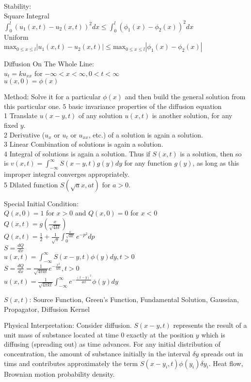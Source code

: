 Stability: \\
Square Integral \\
$\int_0^l (u_1 (x,t) - u_2 (x,t))^2 dx \le \int_0^l (\phi_1 (x) - \phi_2 (x))^2 dx$ \\
Uniform \\
$\text{max}_{0 \le x \le l} |u_1 (x,t) - u_2 (x,t)| \le \text{max}_{0 \le x \le l} |\phi_1 (x) - \phi_2 (x)|$

Diffusion On The Whole Line: \\
$u_t = k u_{xx}$ for $ -\infty < x < \infty, 0 < t < \infty$ \\
$u(x,0)=\phi (x)$

Method: Solve it for a particular $\phi (x)$ and then build the general solution from this particular one. $5$ basic invariance properties of the diffusion equation \\
1 Translate $u(x-y,t)$ of any solution $u(x,t)$ is another solution, for any fixed $y$. \\
2 Derivative ($u_x$ or $u_t$ or $u_{xx}$, etc.) of a solution is again a solution.\\
3 Linear Combination of solutions is again a solution. \\
4 Integral of solutions is again a solution. Thus if $S(x,t)$ is a solution, then so is $v(x,t)=\int_{-\infty}^{\infty} S(x-y,t)g(y)dy$ for any function $g(y)$, as long as this improper integral converges appropriately. \\
5 Dilated function $S(\sqrt{a}x,at)$ for $a>0$.

Special Initial Condition: \\
$Q(x,0)=1$ for $x>0$ and $Q(x,0)=0$ for $x<0$ \\
$Q(x,t)=g \left( \frac{x}{\sqrt{4kt}} \right)$ \\
$Q(x,t)=\frac{1}{2}+\frac{1}{\sqrt{\pi}}\int_0^{\frac{x}{\sqrt{4kt}}} e^{-p^2} dp$ \\
$S=\frac{dQ}{dx}$ \\
$u(x,t)=\int_{-\infty}^{\infty} S(x-y,t) \phi (y) dy, t > 0$ \\
$S = \frac{dQ}{dx} = \frac{1}{\sqrt{4 \pi k t}} e^{-\frac{x^2}{4kt}} , t>0$ \\
$u(x,t)=\frac{1}{\sqrt{4 \pi k t}} \int_{-\infty}^{\infty} e^{-\frac{(x-y)^2}{4kt}} \phi (y) dy$

$S(x,t)$: Source Function, Green's Function, Fundamental Solution, Gaussian, Propagator, Diffusion Kernel

Physical Interpretation: Consider diffusion. $S(x-y,t)$ represents the result of a unit mass of substance located at time $0$ exactly at the position $y$ which is diffusing (spreading out) as time advances. For any initial distribution of concentration, the amount of substance initially in the interval $\delta y$ spreads out in tims and contributes approximately the term $S(x-y_i,t) \phi (y_i) \delta y_i$. Heat flow, Brownian motion probability density.


